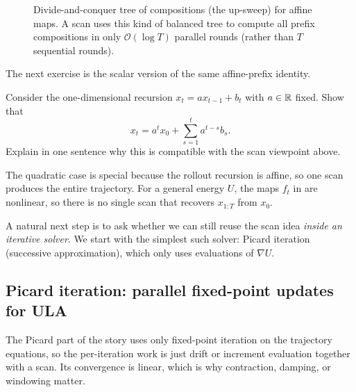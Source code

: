 \documentclass[11pt]{article}
\newif\ifshowsolutions
\newcommand{\SolutionBox}[2][10]{%
  \ifshowsolutions
    \begin{tcolorbox}[stat221panelgray,title={Solution}]
    #2
    \end{tcolorbox}
  \else
    \begin{tcolorbox}[stat221panelgray,unbreakable,title={Workspace}]
    \vspace{#1\baselineskip}
    \end{tcolorbox}
  \fi
}
\begin{document}
\begin{figure}[t]
  \centering
  
  \caption{Divide-and-conquer tree of compositions (the up-sweep) for affine maps.
  A scan uses this kind of balanced tree to compute all prefix compositions in only $\mathcal{O}(\log T)$ parallel rounds (rather than $T$ sequential rounds).}
  \label{fig:parallel-scan-affine}
\end{figure}

The next exercise is the scalar version of the same affine-prefix identity.
\begin{exercise}
\label{ex:scalar-affine-expansion}
Consider the one-dimensional recursion $x_t=ax_{t-1}+b_t$ with $a\in\mathbb{R}$ fixed.
Show that
\[
x_t=a^t x_0+\sum_{s=1}^t a^{t-s} b_s.
\]
Explain in one sentence why this is compatible with the scan viewpoint above.
\end{exercise}
\SolutionBox[12]{%
This is the scalar unrolling that the scan packages in parallel.
We expand by induction.
For $t=1$, $x_1=ax_0+b_1$, which matches the formula.
Assume $x_{t-1}=a^{t-1}x_0+\sum_{s=1}^{t-1} a^{t-1-s}b_s$.
Then
\[
x_t = a x_{t-1}+b_t
= a\left(a^{t-1}x_0+\sum_{s=1}^{t-1} a^{t-1-s}b_s\right)+b_t
= a^t x_0+\sum_{s=1}^{t-1} a^{t-s}b_s+b_t
= a^t x_0+\sum_{s=1}^{t} a^{t-s}b_s.
\]
The scan viewpoint packages these same expansions using associativity: instead of forming powers $a^{t-s}$ explicitly, it composes the per-step affine maps in a divide-and-conquer way to obtain all prefixes in $\mathcal{O}(\log T)$ depth.%
}

The quadratic case is special because the rollout recursion is affine, so one scan produces the entire trajectory.
For a general energy $U$, the maps $f_t$ in  are nonlinear, so there is no single scan that recovers $x_{1:T}$ from $x_0$.

A natural next step is to ask whether we can still reuse the scan idea \emph{inside an iterative solver}.
We start with the simplest such solver: Picard iteration (successive approximation), which only uses evaluations of $\nabla U$.

\subsection{Picard iteration: parallel fixed-point updates for ULA}
\label{subsec:picard}

The Picard part of the story uses only fixed-point iteration on the trajectory equations, so the per-iteration work is just drift or increment evaluation together with a scan.
Its convergence is linear, which is why contraction, damping, or windowing matter.
\end{document}
